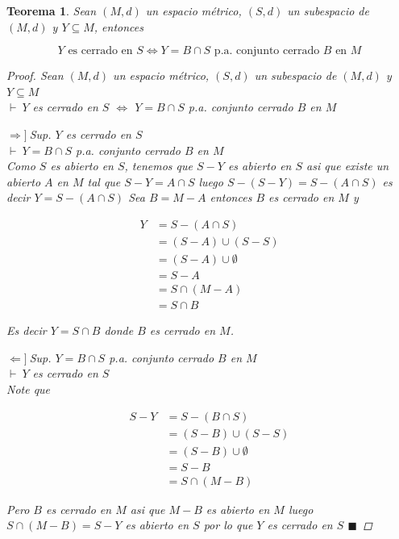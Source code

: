 \documentclass[oneside]{book} %
\theoremstyle{Teorema}
\newtheorem{Teorema}[Definicion]{Teorema}
\theoremstyle{Ejemplos}
\theoremstyle{[Obs]}
\renewcommand{\{}{\left\lbrace} %
\renewcommand{\}}{\right\rbrace} %
\renewcommand{\u}{\cup} %
\newcommand{\n}{\cap} %
\renewcommand{\sc}{\subseteq} %
\renewcommand{\qed}{$\blacksquare$} %
\newcommand{\pd}{$\vdash\ $} %
\newcommand{\necesidad}{$\Rightarrow]\ $} %
\newcommand{\suficiencia}{$\Leftarrow]\ $} %
\begin{document}
			\begin{Teorema}\setlength{\parindent}{0em}
				
				Sean $(M, d)$ un espacio métrico, $(S, d)$ un subespacio de $(M, d)$ y $Y \sc M$, entonces 

				\[ Y \text{ es cerrado en } S \Leftrightarrow Y = B \n S \text{ p.a. conjunto cerrado } B \text{ en } M \] 

				\begin{proof}
					
					Sean $(M, d)$ un espacio métrico, $(S, d)$ un subespacio de $(M, d)$ y $Y \sc M$ \\ 
					\pd $Y$ es cerrado en $S$ $\Leftrightarrow$ $Y = B \n S$ p.a. conjunto cerrado $B$ en $M$ 

					\necesidad Sup. $Y$ es cerrado en $S$ \\ 
					\pd $Y = B \n S$ p.a. conjunto cerrado $B$ en $M$ \\ 
					Como $S$ es abierto en $S$, tenemos que $S - Y$ es abierto en $S$ asi que existe un abierto $A$ en $M$ tal que $S - Y = A \n S$ luego $S - (S - Y) = S - (A \n S)$ es decir $Y = S - (A \n S)$ Sea $B = M - A$ entonces $B$ es cerrado en $M$ y  

					\begin{align*}
						Y &= S - (A \n S) \\ 
						&= (S - A) \u (S - S) \\ 
						&= (S - A) \u \emptyset \\ 
						&= S - A \\ 
						&= S \n (M - A) \\ 
						&= S \n B
					\end{align*}

					Es decir $Y = S \n B$ donde $B$ es cerrado en $M$.

					\suficiencia Sup. $Y = B \n S$ p.a. conjunto cerrado $B$ en $M$ \\ 
					\pd $Y$ es cerrado en $S$ \\ 
					Note que 
					
					\begin{align*}
						S - Y &= S - (B \n S) \\ 
						&= (S - B) \u (S - S) \\ 
						&= (S - B) \u \emptyset \\ 
						&= S - B \\ 
						&= S \n (M - B) 
					\end{align*}

					Pero $B$ es cerrado en $M$ asi que $M - B$ es abierto en $M$ luego $S \n (M - B) = S - Y$ es abierto en $S$ por lo que $Y$ es cerrado en $S$ \qed 
					
				\end{proof}

			\end{Teorema}
\end{document}
